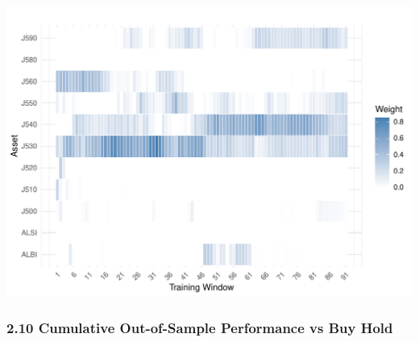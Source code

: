 \documentclass[
  12pt,
]{article}
\begin{document}
\includegraphics{NDXNES005_A1_RMD_files/figure-latex/unnamed-chunk-20-1.pdf}

\subsubsection{2.10 Cumulative Out-of-Sample Performance vs Buy
Hold}\label{cumulative-out-of-sample-performance-vs-buy-hold}
\end{document}

